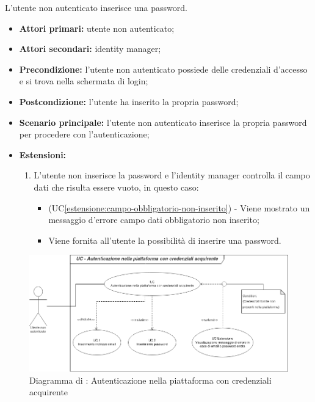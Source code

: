 \label{autenticazione-venditore.modulo.password}

L'utente non autenticato inserisce una password.
\begin{itemize}
	\item \textbf{Attori primari:} utente non autenticato;
	\item \textbf{Attori secondari:} identity manager;
	\item \textbf{Precondizione:} l'utente non autenticato possiede delle credenziali d'accesso e si trova nella schermata di login;
	\item \textbf{Postcondizione:} l'utente ha inserito la propria password;
	\item \textbf{Scenario principale:} l'utente non autenticato inserisce la propria password per procedere con l'autenticazione;
	\item \textbf{Estensioni:} 
	\begin{enumerate}[label=\lett]
		\item L'utente non inserisce la password e l'identity manager controlla il campo dati che risulta essere vuoto, in questo caso:
		\begin{itemize}
			\item (UC\ref{estensione:campo-obbligatorio-non-inserito}) - Viene mostrato un messaggio d'errore campo dati obbligatorio non inserito;
			\item Viene fornita all'utente la possibilità di inserire una password.
		\end{itemize}
	\end{enumerate}
\end{itemize}

\label{autenticazione-acquirente}

\begin{figure}[H]
	\centering
	\includegraphics[scale=0.6]{Immagini/DiagrammiUC/AccessoAcquirente.png}
	\caption{Diagramma di \actualUC: Autenticazione nella piattaforma con credenziali acquirente} 
	\label{fig:LoginAcquirente}
\end{figure}

